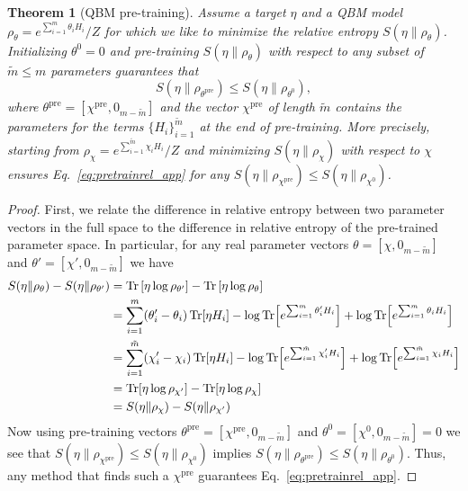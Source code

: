 \documentclass[
    reprint,
    aps,
    prx,
    longbibliography
]{revtex4-2}
\newtheorem{theorem}{Theorem}
\begin{document}
\begingroup
\def\thetheorem{3}
\begin{theorem}[QBM pre-training]\label{appthm:pretraining}
    Assume a target $\eta$ and a QBM model $\rho_\theta=e^{\sum_{i=1}^m \theta_i H_i}/Z$ for which we like to minimize the relative entropy $S(\eta \|\rho_\theta)$. Initializing $\theta^0=0$ and pre-training $S(\eta\| \rho_\theta)$ with respect to any subset of $\tilde{m} \leq m $ parameters guarantees that 
    \begin{equation}
    \label{eq:pretrainrel_app}
         S(\eta \|\rho_{\theta^\mathrm{pre}}) \leq S(\eta \|\rho_{\theta^0}), 
    \end{equation} 
    where $\theta^\mathrm{pre} = [\chi^{\mathrm{pre}}, 0_{m-\tilde{m}}]$ and the vector $\chi^{\mathrm{pre}}$ of length $\tilde{m}$ contains the parameters for the terms $\{H_i\}_{i=1}^{\tilde{m}}$ at the end of pre-training.
    More precisely, starting from $\rho_\chi=e^{\sum_{i=1}^{\tilde{m}} \chi_i H_i}/Z$ and minimizing $S(\eta \|\rho_\chi)$ with respect to $\chi$ ensures Eq.~\eqref{eq:pretrainrel_app} for any $S(\eta \|\rho_{\chi^{\mathrm{pre}}})\leq S(\eta \|\rho_{\chi^0})$.
\end{theorem}
\endgroup

\begin{proof}
First, we relate the difference in relative entropy between two parameter vectors in the full space to the difference in relative entropy of the pre-trained parameter space. In particular, for any real parameter vectors $\theta = [\chi, 0_{m-\tilde{m}}]$ and $\theta' = [\chi', 0_{m-\tilde{m}}]$ we have
\begin{align}
\begin{split}
    S(\eta \|\rho_{\theta}) - S(\eta \|\rho_{\theta'}) &= \Tr\left[\eta \log \rho_{\theta'}\right] - \Tr\left[\eta \log \rho_\theta\right]\\
    &=\sum_{i=1}^m(\theta_i'-\theta_i)\Tr[\eta H_i] - \log\Tr[e^{\sum_{i=1}^m\theta_i'H_i}] + \log\Tr[e^{\sum_{i=1}^m\theta_iH_i}] \\
    &= \sum_{i=1}^{\tilde{m}}(\chi_i'-\chi_i)\Tr[\eta H_i] - \log\Tr[e^{\sum_{i=1}^{\tilde{m}}\chi_i'H_i}] + \log\Tr[e^{\sum_{i=1}^{\tilde{m}}\chi_iH_i}] \\
    &= \Tr[\eta \log \rho_{\chi'}] - \Tr[\eta \log \rho_\chi] \\
    &= S(\eta \|\rho_{\chi}) - S(\eta \|\rho_{\chi'})
\end{split}
\end{align}
Now using pre-training vectors $\theta^\mathrm{pre} = [\chi^{\mathrm{pre}}, 0_{m-\tilde{m}}]$ and $\theta^0 = [\chi^0, 0_{m-\tilde{m}}]=0$ we see that $S(\eta \|\rho_{\chi^{\mathrm{pre}}})\leq S(\eta \|\rho_{\chi^0})$ implies  $S(\eta \|\rho_{\theta^\mathrm{pre}}) \leq S(\eta \|\rho_{\theta^0})$. Thus, any method that finds such a $\chi^{\mathrm{pre}}$ guarantees Eq.~\eqref{eq:pretrainrel_app}.
\end{proof}
\end{document}
